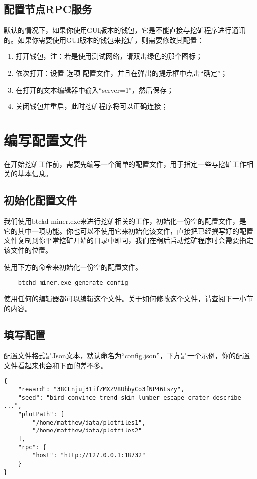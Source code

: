 \subsection{配置节点RPC服务}
\begin{flushleft}
    默认的情况下，如果你使用GUI版本的钱包，它是不能直接与挖矿程序进行通讯的。如果你需要使用GUI版本的钱包来挖矿，则需要修改其配置：
\end{flushleft}
\begin{enumerate}
    \item 打开钱包，注：若是使用测试网络，请双击绿色的那个图标；
    \item 依次打开：设置-选项-配置文件，并且在弹出的提示框中点击``确定''；
    \item 在打开的文本编辑器中输入``server=1''，然后保存；
    \item 关闭钱包并重启，此时挖矿程序将可以正确连接；
\end{enumerate}
\section{编写配置文件}
\begin{flushleft}
    在开始挖矿工作前，需要先编写一个简单的配置文件，用于指定一些与挖矿工作相关的基本信息。
\end{flushleft}
\subsection{初始化配置文件}
\begin{flushleft}
    我们使用btchd-miner.exe来进行挖矿相关的工作，初始化一份空的配置文件，是它的其中一项功能。你也可以不使用它来初始化该文件，直接把已经撰写好的配置文件复制到你平常挖矿开始的目录中即可，我们在稍后启动挖矿程序时会需要指定该文件的位置。
\end{flushleft}
\begin{flushleft}
    使用下方的命令来初始化一份空的配置文件。
\end{flushleft}
\scriptsize
\begin{verbatim}
    btchd-miner.exe generate-config
\end{verbatim}
\normalsize
\begin{flushleft}
    使用任何的编辑器都可以编辑这个文件。关于如何修改这个文件，请查阅下一小节的内容。
\end{flushleft}
\subsection{填写配置}
\begin{flushleft}
    配置文件格式是Json文本，默认命名为``config.json''，下方是一个示例，你的配置文件看起来也会和下面的差不多。
\end{flushleft}
\scriptsize
\begin{verbatim}
{
    "reward": "38CLnjuj31ifZMXZV8UhbyCo3fNP46Lszy",
    "seed": "bird convince trend skin lumber escape crater describe ...",
    "plotPath": [
        "/home/matthew/data/plotfiles1",
        "/home/matthew/data/plotfiles2"
    ],
    "rpc": {
        "host": "http://127.0.0.1:18732"
    }
}
\end{verbatim}
\normalsize
